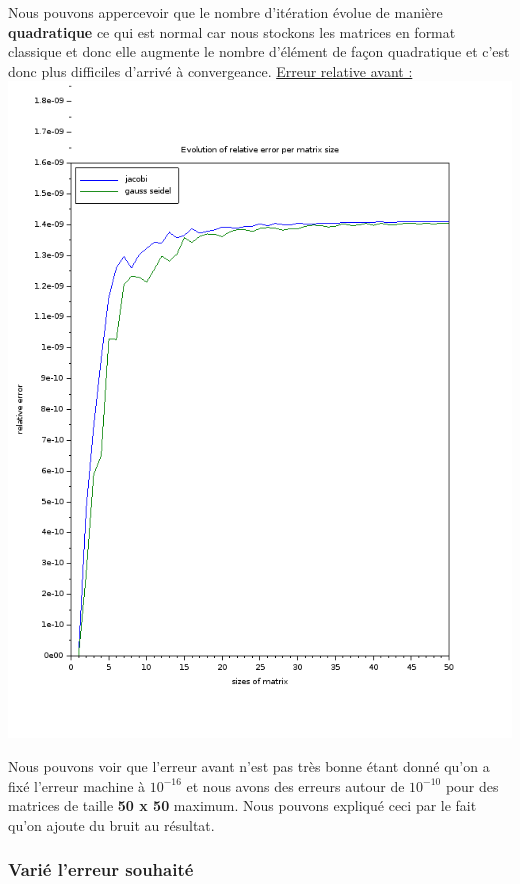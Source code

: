 \documentclass[11pt]{article}
\begin{document}
Nous pouvons appercevoir que le nombre d'itération évolue de manière
\textbf{quadratique} ce qui est normal car nous stockons les matrices en format
classique et donc elle augmente le nombre d'élément de façon
quadratique et c'est donc plus difficiles d'arrivé à convergeance.\newline
\vspace{5mm}
\underline{Erreur relative avant :}\newline
\includegraphics[scale=0.5]{img/number_of_iteration_relres.png}

Nous pouvons voir que l'erreur avant n'est pas très bonne étant donné
qu'on a fixé l'erreur machine à $10^{-16}$ et nous avons des erreurs
autour de $10^{-10}$ pour des matrices de taille \textbf{50 x 50}
maximum. Nous pouvons expliqué ceci par le fait qu'on ajoute du bruit
au résultat.

\subsubsection{Varié l'erreur souhaité}
\end{document}
